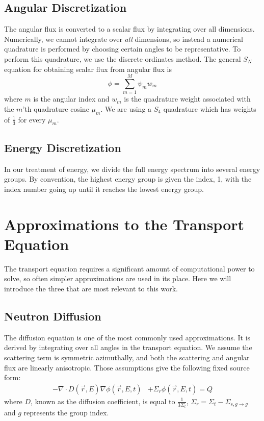 \subsection{Angular Discretization}
The angular flux is converted to a scalar flux by integrating over all dimensions. Numerically, we cannot integrate over \textit{all} dimensions, so instead a numerical quadrature is performed by choosing certain angles to be representative.  To perform this quadrature, we use the discrete ordinates method. The general $S_N$ equation for obtaining scalar flux from angular flux is
\begin{equation}
    \phi = \sum\limits_{m=1}^{M}\psi_m w_m
\end{equation}
where $m$ is the angular index and $w_m$ is the quadrature weight associated with the $m$'th quadrature cosine $\mu_m$. We are using a $S_4$ quadrature which has weights of $\frac{1}{3}$ for every $\mu_m$.

\subsection{Energy Discretization}
In our treatment of energy, we divide the full energy spectrum into several energy groups. By convention, the highest energy group is given the index, 1, with the index number going up until it reaches the lowest energy group. 

\section{Approximations to the Transport Equation}
The transport equation requires a significant amount of computational power to solve, so often simpler approximations are used in its place. Here we will introduce the three that are most relevant to this work.

\subsection{Neutron Diffusion}
The diffusion equation is one of the most commonly used approximations. It is derived by integrating over all angles in the transport equation. We assume the scattering term is symmetric azimuthally, and both the scattering and angular flux are linearly anisotropic. Those assumptions give the following fixed source form:
\begin{equation}
\begin{split}
 - \nabla \cdot D(\vec{r}, E)\nabla\phi(\vec{r}, E, t) &+ \Sigma_r \phi(\vec{r}, E, t) = Q
\end{split}
\label{eq:diffusion_fixed_source}
\end{equation}
where $D$, known as the diffusion coefficient, is equal to $\frac{1}{3\Sigma_t}$, $\Sigma_r = \Sigma_t - \Sigma_{s, g \rightarrow g}$ and $g$ represents the group index. 


